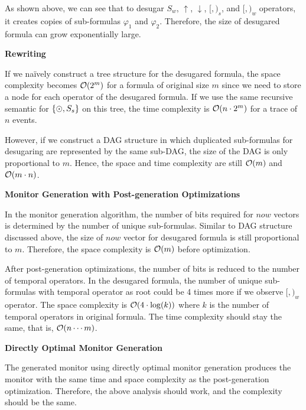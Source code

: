 \documentclass{article}
\begin{document}
\begin{enumerate}
As shown above, we can see that to desugar $S_w$, $\uparrow$, $\downarrow$,
$\lbrack , )_s$, and $\lbrack , )_w$ operators, it creates copies of sub-formulas
$\varphi_1$ and $\varphi_2$.
Therefore, the size of desugared formula can grow exponentially large.

\textbf{Rewriting}

If we na\"ively construct a tree structure for the desugared formula,
the space complexity becomes $\mathcal{O}(2^m)$ for a \ptLTL formula of original size
$m$ since we need to store a node for each operator of the desugared formula.
If we use the same recursive semantic for $\{\odot, S_s\}$ on this tree,
the time complexity is $\mathcal{O}(n \cdot 2^{m})$ for a trace of $n$ events.

However, if we construct a DAG structure in which duplicated sub-formulas 
for desugaring are represented by the same sub-DAG,
the size of the DAG is only proportional to $m$.
Hence, the space and time complexity are still $\mathcal{O}(m)$ and $\mathcal{O}(m \cdot n)$.

\textbf{Monitor Generation with Post-generation Optimizations}

In the monitor generation algorithm, the number of bits required for $now$
vectors is determined by the number of unique sub-formulas.
Similar to DAG structure discussed above, the size of $now$ vector for
desugared formula is still proportional to $m$. 
Therefore, the space complexity is $\mathcal{O}(m)$ before optimization.

After post-generation optimizations,
the number of bits is reduced to the number of temporal operators.
In the desugared formula, the number of unique sub-formulas with temporal operator
as root could be 4 times more if we observe $\lbrack , )_w$ operator.
The space complexity is $\mathcal{O}(4\cdot \log(k))$ where $k$ is the number of
temporal operators in original formula.
The time complexity should stay the same, that is, $\mathcal{O}(n \cdots m)$.

\textbf{Directly Optimal Monitor Generation}

The generated monitor using directly optimal monitor generation produces the monitor
with the same time and space complexity as the post-generation optimization.
Therefore, the above analysis should work, and the complexity should be the same.

\newcommand{\CALL}{\texttt{call}\xspace}
\newcommand{\RETURN}{\texttt{return}\xspace}
\newcommand{\BEGIN}{\texttt{begin}\xspace}
\newcommand{\END}{\texttt{end}\xspace}
\newcommand{\ASince}{\overline{S}\xspace}
\newcommand{\APrev}{\overline{\Prev}\xspace}


\end{enumerate}
\end{document}
